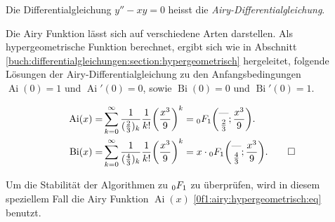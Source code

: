 \begin{definition}
    \label{0f1:airy:differentialgleichung:def}
    Die Differentialgleichung
    $y'' - xy = 0$
    heisst die {\em Airy-Differentialgleichung}.
\end{definition}

Die Airy Funktion lässt sich auf verschiedene Arten darstellen. 
Als hypergeometrische Funktion berechnet, ergibt sich wie in Abschnitt \ref{buch:differentialgleichungen:section:hypergeometrisch} hergeleitet, folgende Lösungen der Airy-Differentialgleichung zu den Anfangsbedingungen $\operatorname{Ai}(0)=1$ und $\operatorname{Ai}'(0)=0$, sowie $\operatorname{Bi}(0)=0$ und $\operatorname{Bi}'(0)=1$.

\begin{align}
\label{0f1:airy:hypergeometrisch:eq}
\operatorname{Ai}(x)
=&
\sum_{k=0}^\infty
\frac{1}{(\frac23)_k} \frac{1}{k!}\biggl(\frac{x^3}{9}\biggr)^k
=
\mathstrut_0F_1\biggl(
\begin{matrix}\text{---}\\\frac23\end{matrix};\frac{x^3}{9}
\biggr).
\\
\operatorname{Bi}(x)
=&
\sum_{k=0}^\infty
\frac{1}{(\frac43)_k} \frac{1}{k!}\biggl(\frac{x^3}{9}\biggr)^k
=
x\cdot\mathstrut_0F_1\biggl(
\begin{matrix}\text{---}\\\frac43\end{matrix};
\frac{x^3}{9}
\biggr).
\qedhere
\end{align}

Um die Stabilität der Algorithmen zu $\mathstrut_0F_1$ zu überprüfen, wird in diesem speziellem Fall die Airy Funktion $\operatorname{Ai}(x)$ \eqref{0f1:airy:hypergeometrisch:eq}
benutzt.


